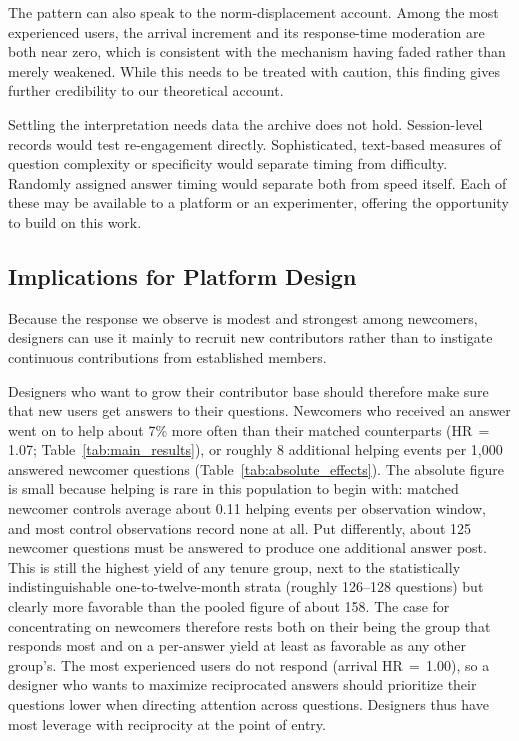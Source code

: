 The pattern can also speak to the norm-displacement account. Among the most experienced users, the arrival increment and its response-time moderation are both near zero, which is consistent with the mechanism having faded rather than merely weakened. While this needs to be treated with caution, this finding gives further credibility to our theoretical account.

Settling the interpretation needs data the archive does not hold. Session-level records would test re-engagement directly. Sophisticated, text-based measures of question complexity or specificity would separate timing from difficulty. Randomly assigned answer timing would separate both from speed itself. Each of these may be available to a platform or an experimenter, offering the opportunity to build on this work.

\subsection{Implications for Platform Design}
\label{sec:design_implications}

Because the response we observe is modest and strongest among newcomers, designers can use it mainly to recruit new contributors rather than to instigate continuous contributions from established members.

Designers who want to grow their contributor base should therefore make sure that new users get answers to their questions. Newcomers who received an answer went on to help about 7\% more often than their matched counterparts (HR\,$=$\,1.07; Table~\ref{tab:main_results}), or roughly 8 additional helping events per 1{,}000 answered newcomer questions (Table~\ref{tab:absolute_effects}). The absolute figure is small because helping is rare in this population to begin with: matched newcomer controls average about 0.11 helping events per observation window, and most control observations record none at all. Put differently, about 125 newcomer questions must be answered to produce one additional answer post. This is still the highest yield of any tenure group, next to the statistically indistinguishable one-to-twelve-month strata (roughly 126--128 questions) but clearly more favorable than the pooled figure of about 158. The case for concentrating on newcomers therefore rests both on their being the group that responds most and on a per-answer yield at least as favorable as any other group's. The most experienced users do not respond (arrival HR\,$=$\,1.00), so a designer who wants to maximize reciprocated answers should prioritize their questions lower when directing attention across questions. Designers thus have most leverage with reciprocity at the point of entry.

